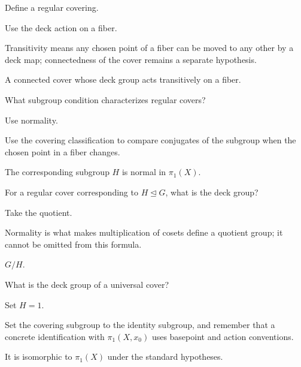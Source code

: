\begin{exercise}\label{exr:viii12-12}
Define a regular covering.
\end{exercise}
\begin{hint}
Use the deck action on a fiber.

Transitivity means any chosen point of a fiber can be moved to any other by a deck map; connectedness of the cover remains a separate hypothesis.
\end{hint}
\begin{solution}
A connected cover whose deck group acts transitively on a fiber.
\end{solution}

\begin{exercise}\label{exr:viii12-13}
What subgroup condition characterizes regular covers?
\end{exercise}
\begin{hint}
Use normality.

Use the covering classification to compare conjugates of the subgroup when the chosen point in a fiber changes.
\end{hint}
\begin{solution}
The corresponding subgroup \(H\) is normal in \(\pi_1(X)\).
\end{solution}

\begin{exercise}\label{exr:viii12-14}
For a regular cover corresponding to \(H\trianglelefteq G\), what is the deck group?
\end{exercise}
\begin{hint}
Take the quotient.

Normality is what makes multiplication of cosets define a quotient group; it cannot be omitted from this formula.
\end{hint}
\begin{solution}
\(G/H\).
\end{solution}

\begin{exercise}\label{exr:viii12-15}
What is the deck group of a universal cover?
\end{exercise}
\begin{hint}
Set \(H=1\).

Set the covering subgroup to the identity subgroup, and remember that a concrete identification with \(\pi_1(X,x_0)\) uses basepoint and action conventions.
\end{hint}
\begin{solution}
It is isomorphic to \(\pi_1(X)\) under the standard hypotheses.
\end{solution}

